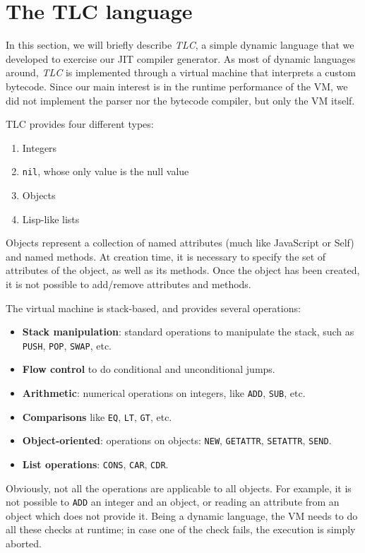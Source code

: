 \section{The TLC language}

In this section, we will briefly describe \emph{TLC}, a simple dynamic
language that we developed to exercise our JIT compiler generator.  As most of
dynamic languages around, \emph{TLC} is implemented through a virtual machine
that interprets a custom bytecode. Since our main interest is in the runtime
performance of the VM, we did not implement the parser nor the bytecode
compiler, but only the VM itself.

TLC provides four different types:
\begin{enumerate}
\item Integers
\item \lstinline{nil}, whose only value is the null value
\item Objects
\item Lisp-like lists
\end{enumerate}

Objects represent a collection of named attributes (much like JavaScript or
Self) and named methods.  At creation time, it is necessary to specify the set
of attributes of the object, as well as its methods.  Once the object has been
created, it is not possible to add/remove attributes and methods.

The virtual machine is stack-based, and provides several operations:

\begin{itemize}
\item \textbf{Stack manipulation}: standard operations to manipulate the
  stack, such as \lstinline{PUSH}, \lstinline{POP}, \lstinline{SWAP}, etc.
\item \textbf{Flow control} to do conditional and unconditional jumps.
\item \textbf{Arithmetic}: numerical operations on integers, like
  \lstinline{ADD}, \lstinline{SUB}, etc.
\item \textbf{Comparisons} like \lstinline{EQ}, \lstinline{LT},
  \lstinline{GT}, etc.
\item \textbf{Object-oriented}: operations on objects: \lstinline{NEW},
  \lstinline{GETATTR}, \lstinline{SETATTR}, \lstinline{SEND}.
\item \textbf{List operations}: \lstinline{CONS}, \lstinline{CAR},
  \lstinline{CDR}.
\end{itemize}

Obviously, not all the operations are applicable to all objects. For example,
it is not possible to \lstinline{ADD} an integer and an object, or reading an
attribute from an object which does not provide it.  Being a dynamic language,
the VM needs to do all these checks at runtime; in case one of the check
fails, the execution is simply aborted.


